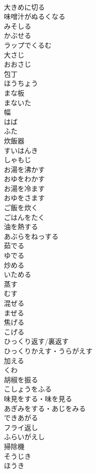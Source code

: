 \documentclass[8pt]{extreport}
\begin{document}
\begin{CJK}{UTF8}{min}
\\	大きめに切る	
\\	味噌汁がぬるくなる	
\\	みそしる
\\	かぶせる	
\\	ラップでくるむ	
\\	大さじ	
\\	おおさじ
\\	包丁	
\\	ほうちょう
\\	まな板	
\\	まないた
\\	幅	
\\	はば
\\	ふた	
\\	炊飯器	
\\	すいはんき
\\	しゃもじ	
\\	お湯を沸かす	
\\	おゆをわかす
\\	お湯を冷ます	
\\	おゆをさます
\\	ご飯を炊く	
\\	ごはんをたく
\\	油を熱する	
\\	あぶらをねっする
\\	茹でる	
\\	ゆでる
\\	炒める	
\\	いためる
\\	蒸す	
\\	むす
\\	混ぜる	
\\	まぜる
\\	焦げる	
\\	こげる
\\	ひっくり返す/裏返す	
\\	ひっくりかえす・うらがえす
\\	加える	
\\	くわ
\\	胡椒を振る	
\\	こしょうをふる
\\	味見をする・味を見る	
\\	あぎみをする・あじをみる
\\	できあがる	
\\	フライ返し	
\\	ふらいがえし
\\	掃除機	
\\	そうじき
\\	ほうき	

\end{CJK}
\end{document}
